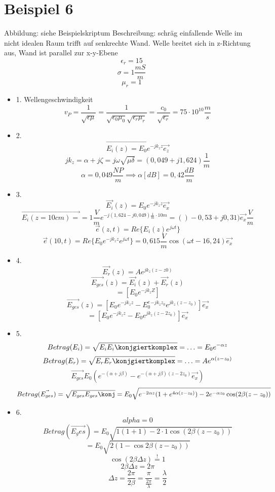 \documentclass[a4paper]{article}
\begin{document}
\section*{Beispiel 6}
Abbildung: siehe Beispielskriptum
Beschreibung: schräg einfallende Welle im nicht idealen Raum trifft auf senkrechte Wand.
Welle breitet sich in z-Richtung aus, Wand ist parallel zur x-y-Ebene
\[  \epsilon_{r}=15 \]
\[ \sigma=1 \frac{mS}{m} \]
\[ \mu_{r}=1 \]
\begin{itemize}
    \item 1. Wellengeschwindigkeit
        \[ v_{P}=\frac{1}{\sqrt{\epsilon\mu}}=\frac{1}{\sqrt{\epsilon_{0}\mu_{0}} \sqrt{\epsilon_{r}\mu_{r}} }=\frac{c_{0}}{\sqrt{\epsilon_{r}} } =75\cdot 10^{10}\frac{m}{s}\]

    \item 2.
        \[ \vec{E_{i}(z)=E_{0}e^{-jk_{z}z}}\vec{e_{z}} \]
        \[ jk_{z}=\alpha+j\zeta=j\omega\sqrt{\mu\delta} =(0,049+j1,624)\frac{1}{m} \]
        \[ \alpha=0,049  \frac{NP}{m} \implies \alpha[dB]=0,42 \frac{dB}{m} \]

    \item 3. 
        \[ \vec{E_{i}}(z)=E_{0}e^{-jk_{z}z}\vec{e_{x}} \]
        \[ \vec{E_{i}(z=10cm)=}=1 \frac{V}{m}e^{-j(1,624-j0,049)\frac{1}{m}\cdot 10m}=()-0,53+j0,31)\vec{e_{x}}\frac{V}{m}\]
        \[ \vec{e}(z,t)=Re\{E_{i}(z)e^{j\omega t}\} \]
        \[ \vec{e}(10,t)=Re\{E_{0}e^{-jk_{z}z}e^{j\omega t}\} = 0,615 \frac{V}{m}\cos(\omega t - 16,24)\vec{e_{x}}\]

    \item 4.
        \[ \vec{E_{r}}(z)=Ae^{jk_{z}(z-z0)} \]
        \[ \vec{E_{ges}}(z)=\vec{E_{i}}(z)+\vec{E_{r}}(z) \]
        \[ =[E_{0}e^{-jk_{z}Z}] \]
        \[ \vec{E_{ges}}(z)=[E_{0}e^{-jk_{z}z}-E_{0}^e^{-jk_{z}z_{0}}e^{jk_{z}(z-z_0)}] \vec{e_{x}}\]
        \[ =[E_{0}e^{-jk_{z}z}-E_{0}e^{jk_{z}(z-2z_0)}]\vec{e_{x}} \]
        
    \item 5.
        \[ Betrag(E_{i})=\sqrt{E_{i}E_{i}\konjgiertkomplex}=\ldots=E_{0}e^{-\alpha z}\]
        \[ Betrag(E_{r})=\sqrt{E_{r}E_{r}\konjgiertkomplex}=\ldots=Ae^{\alpha(z-z_{0})} \]
        \[ \vec{E_{ges}}E_{0}(e^{-(\alpha+j\beta)}-e^{-(\alpha+j\beta)(z-2z_{0})}\vec{e_{x}}) \]
        \[ Betrag(\vec{E_{ges}})=\sqrt{E_{ges}E_{ges}\konj}=E_{0}\sqrt{e^{-2\alpha z}(1+e^{4\alpha (z-z_{0})})-2e^{-\alpha z_{0}}\cos(2\beta(z-z_{0}))}  \]

    \item 6.
        \[ alpha = 0 \]
        \[ Betrag(\vec{E_ges})=E_{0}\sqrt{1(1+1)-2\cdot 1\cos(2\beta(z-z_{0}))} \]
        \[ =E_{0}\sqrt{2(1-\cos2\beta(z-z_{0}))}  \]
        \[\cos(2\beta\Delta z)\overset{!}{=}1 \]
        \[ 2\beta\Delta z = 2\pi \]
        \[ \Delta z =\frac{2\pi}{2\beta}=\frac{\pi}{\frac{2\pi}{\lambda}}=\frac{\lambda}{2}\]
\end{itemize}
\end{document}
